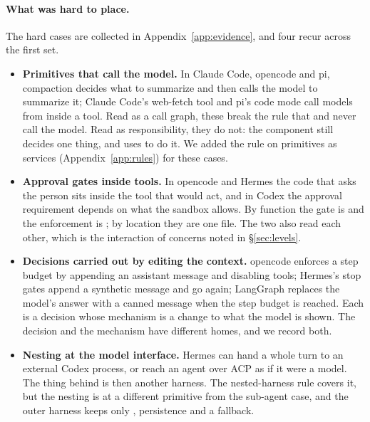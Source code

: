 \paragraph{What was hard to place.} The hard cases are collected in Appendix~\ref{app:evidence}, and four recur across the first set.
\begin{itemize}
  \item \textbf{Primitives that call the model.} In Claude Code, opencode and pi, compaction decides what to summarize and then calls the model to summarize it; Claude Code's web-fetch tool and pi's code mode call models from inside a tool. Read as a call graph, these break the rule that  and  never call the model. Read as responsibility, they do not: the component still decides one thing, and uses  to do it. We added the rule on primitives as services (Appendix~\ref{app:rules}) for these cases.
  \item \textbf{Approval gates inside tools.} In opencode and Hermes the code that asks the person sits inside the tool that would act, and in Codex the approval requirement depends on what the sandbox allows. By function the gate is  and the enforcement is ; by location they are one file. The two also read each other, which is the interaction of concerns noted in \S\ref{sec:levels}.
  \item \textbf{Decisions carried out by editing the context.} opencode enforces a step budget by appending an assistant message and disabling tools; Hermes's stop gates append a synthetic message and go again; LangGraph replaces the model's answer with a canned message when the step budget is reached. Each is a  decision whose mechanism is a change to what the model is shown. The decision and the mechanism have different homes, and we record both.
  \item \textbf{Nesting at the model interface.} Hermes can hand a whole turn to an external Codex process, or reach an agent over ACP as if it were a model. The thing behind  is then another harness. The nested-harness rule covers it, but the nesting is at a different primitive from the sub-agent case, and the outer harness keeps only , persistence and a fallback.
\end{itemize}
